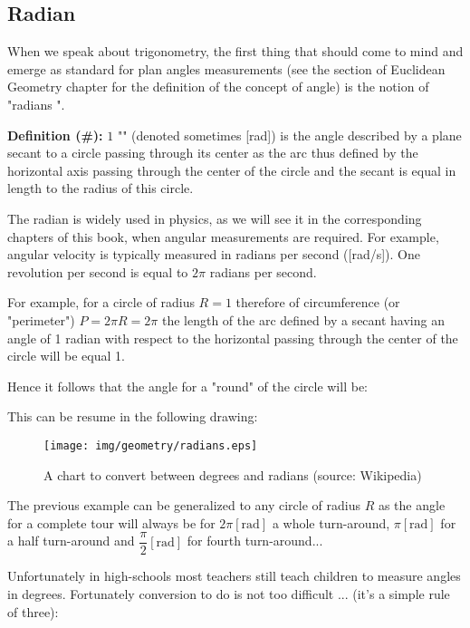 	\subsection{Radian}\label{radian}
	When we speak about trigonometry, the first thing that should come to mind and emerge as standard for plan angles measurements (see the section of Euclidean Geometry chapter for the definition of the concept of angle) is the notion of "radians ".

	\textbf{Definition (\#\mydef):} $1$ "" (denoted sometimes [rad]) is the angle described by a plane secant to a circle passing through its center as the arc thus defined by the horizontal axis passing through the center of the circle and the secant is equal in length to the radius of this circle.

	\begin{tcolorbox}[title=Remark,colframe=black,arc=10pt]
	The radian is widely used in physics, as we will see it in the corresponding chapters of this book, when angular measurements are required. For example, angular velocity is typically measured in radians per second ([rad/s]). One revolution per second is equal to $2\pi$ radians per second.
	\end{tcolorbox}
	
	For example, for a circle of radius $R=1$ therefore of circumference (or "perimeter") $P=2\pi R=2\pi$ the length of the arc defined by a secant having an angle of 1 radian with respect to the horizontal passing through the center of the circle will be equal 1.

	Hence it follows that the angle for a "round" of the circle will be:
	
	This can be resume in the following drawing:
	\begin{figure}[H]
		\centering
		\texttt{[image: img/geometry/radians.eps]}
		\caption[A chart to convert between degrees and radians]{A chart to convert between degrees and radians (source: Wikipedia)}
	\end{figure}
	The previous example can be generalized to any circle of radius $R$ as the angle for a complete tour will always be for $2\pi [\text{rad}]$ a whole turn-around, $\pi [\text{rad}]$  for a half turn-around and $\dfrac{\pi}{2} [\text{rad}]$ for fourth turn-around...
	
	Unfortunately in high-schools most teachers still teach children to measure angles in degrees. Fortunately conversion to do is not too difficult ... (it's a simple rule of three):
		
